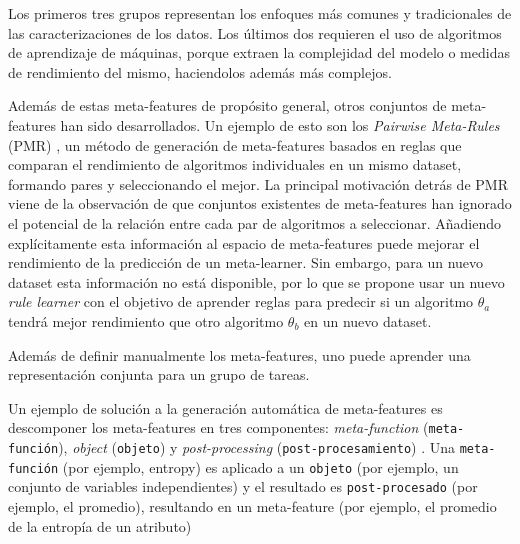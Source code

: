 Los primeros tres grupos representan los enfoques más comunes y tradicionales de las caracterizaciones de los datos. Los últimos dos requieren el uso de algoritmos de aprendizaje de máquinas, porque extraen la complejidad del modelo o medidas de rendimiento del mismo, haciendolos además más complejos.

Además de estas meta-features de propósito general, otros conjuntos de meta-features han sido desarrollados. Un ejemplo de esto son los \textit{Pairwise Meta-Rules} (PMR) \cite{sun2013pairwise}, un método de generación de meta-features basados en reglas que comparan el rendimiento de algoritmos individuales en un mismo dataset, formando pares y seleccionando el mejor. La principal motivación detrás de PMR viene de la observación de que conjuntos existentes de meta-features han ignorado el potencial de la relación entre cada par de algoritmos a seleccionar. Añadiendo explícitamente esta información al espacio de meta-features puede mejorar el rendimiento de la predicción de un meta-learner. Sin embargo, para un nuevo dataset esta información no está disponible, por lo que se propone usar un nuevo \textit{rule learner} con el objetivo de aprender reglas para predecir si un algoritmo $\theta_a$ tendrá mejor rendimiento que otro algoritmo $\theta_b$ en un nuevo dataset.

Además de definir manualmente los meta-features, uno puede aprender una representación conjunta para un grupo de tareas. 

Un ejemplo de solución a la generación automática de meta-features es descomponer los meta-features en tres componentes: \textit{meta-function} (\texttt{meta-función}), \textit{object} (\texttt{objeto}) y \textit{post-processing} (\texttt{post-procesamiento}) \cite{Pinto2016TowardsAG, pinto2014framework}. Una \texttt{meta-función} (por ejemplo, entropy) es aplicado a un \texttt{objeto} (por ejemplo, un conjunto de variables independientes) y el resultado es \texttt{post-procesado} (por ejemplo, el promedio), resultando en un meta-feature (por ejemplo, el promedio de la entropía de un atributo) %

